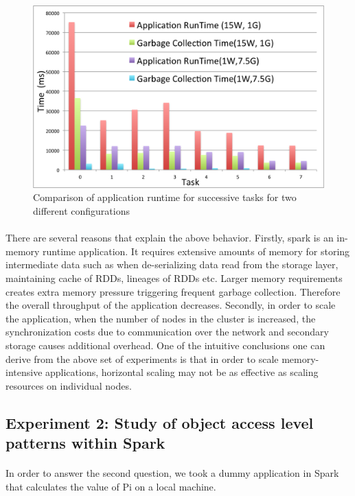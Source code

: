 \begin{figure}[!ht]
\caption{Comparison of application runtime for successive tasks for two different configurations}
\label{fig:exp5}
\includegraphics[scale=0.50]{./images/exp5.png}
\end{figure}

\paragraph{}
There are several reasons that explain the above behavior.  Firstly, spark is an in-memory runtime application. It requires extensive amounts of memory for storing intermediate data such as when de-serializing data read from the storage layer, maintaining cache of RDDs, lineages of RDDs etc. Larger memory requirements creates extra memory pressure triggering frequent garbage collection. Therefore the overall throughput of the application decreases. Secondly, in order to scale the application, when the number of nodes in the cluster is increased, the synchronization costs due to communication over the network and secondary storage causes additional overhead.  One of the intuitive conclusions one can derive from the above set of experiments is that in order to scale memory-intensive applications, horizontal scaling may not be as effective as scaling resources on individual nodes. 

\subsection{Experiment 2: Study of object access level patterns within Spark} 
\paragraph{} In order to answer the second question, we took a dummy application in Spark that calculates the value of Pi on a local machine. 
